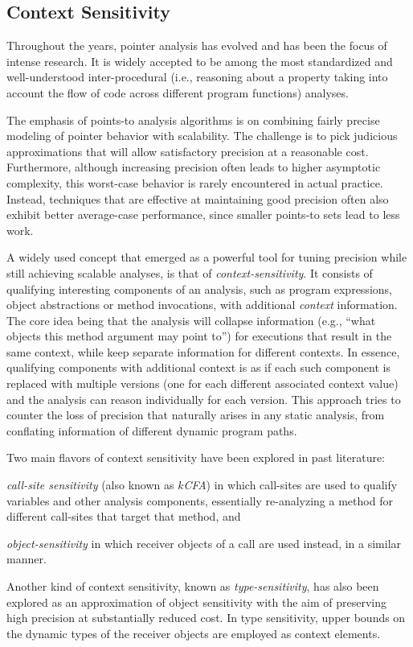 \subsection{Context Sensitivity}

Throughout the years, pointer analysis has evolved and has been the focus of
intense research. It is widely accepted to be among the most standardized and
well-understood inter-procedural (i.e., reasoning about a property taking into
account the flow of code across different program functions) analyses.

The emphasis of points-to analysis algorithms is on combining fairly precise
modeling of pointer behavior with scalability. The challenge is to pick
judicious approximations that will allow satisfactory precision at a reasonable
cost. Furthermore, although increasing precision often leads to higher
asymptotic complexity, this worst-case behavior is rarely encountered in actual
practice. Instead, techniques that are effective at maintaining good precision
often also exhibit better average-case performance, since smaller points-to
sets lead to less work.

A widely used concept that emerged as a powerful tool for tuning precision
while still achieving scalable analyses, is that of \emph{context-sensitivity}.
It consists of qualifying interesting components of an analysis, such as
program expressions, object abstractions or method invocations, with additional
\emph{context} information. The core idea being that the analysis will collapse
information (e.g., ``what objects this method argument may point to'') for
executions that result in the same context, while keep separate information for
different contexts. In essence, qualifying components with additional context
is as if each such component is replaced with multiple versions (one for each
different associated context value) and the analysis can reason individually
for each version. This approach tries to counter the loss of precision that
naturally arises in any static analysis, from conflating information of
different dynamic program paths.

Two main flavors of context sensitivity have been explored in past literature:
\begin{inparaenum}[(1)]
\item \emph{call-site sensitivity} (also known as \emph{$k$CFA}) \cite{col:1981:Sharir,thesis:Shivers} 
in which call-sites are used to qualify variables and other analysis components, essentially re-analyzing a method for different call-sites that target that method, and
\item \emph{object-sensitivity} \cite{issta:2002:Milanova,article:2005:Milanova,popl:2011:Smaragdakis} in which receiver objects of a call are used
	instead, in a similar manner.
\end{inparaenum}
Another kind of context sensitivity, known as \emph{type-sensitivity}, has also
been explored as an approximation of object sensitivity with the aim of
preserving high precision at substantially reduced cost. In type sensitivity,
upper bounds on the dynamic types of the receiver objects are employed as
context elements.

